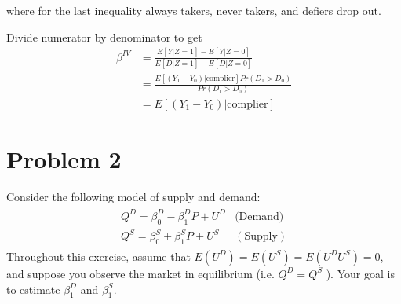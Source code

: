 \documentclass{article}
\begin{document}
where for the last inequality always takers, never takers, and defiers
drop out. 

Divide numerator by denominator to get 
\begin{align*}
\beta^{IV} & =\frac{E\left[Y|Z=1\right]-E\left[Y|Z=0\right]}{E\left[D|Z=1\right]-E\left[D|Z=0\right]}\\
 & =\frac{E\left[\left(Y_{1}-Y_{0}\right)|\text{complier}\right]Pr\left(D_{1}>D_{0}\right)}{Pr\left(D_{1}>D_{0}\right)}\\
 & =E\left[\left(Y_{1}-Y_{0}\right)|\text{complier}\right]
\end{align*}


\newpage
\section*{Problem 2}
Consider the following model of supply and demand:
\begin{align*}
\begin{array}{cl}
Q^{D}=\beta_{0}^{D}-\beta_{1}^{D} P+U^{D} & \text{(Demand)} \\
Q^{S}=\beta_{0}^{S}+\beta_{1}^{S} P+U^{S} & (\text{Supply})
\end{array}
\end{align*}
Throughout this exercise, assume that $E\left(U^{D}\right)=E\left(U^{S}\right)=E\left(U^{D} U^{S}\right)=0$, and suppose you observe the market in equilibrium (i.e. $Q^{D}=Q^{S}$ ). Your goal is to estimate $\beta_{1}^{D}$ and $\beta_{1}^{S}$.
\end{document}
